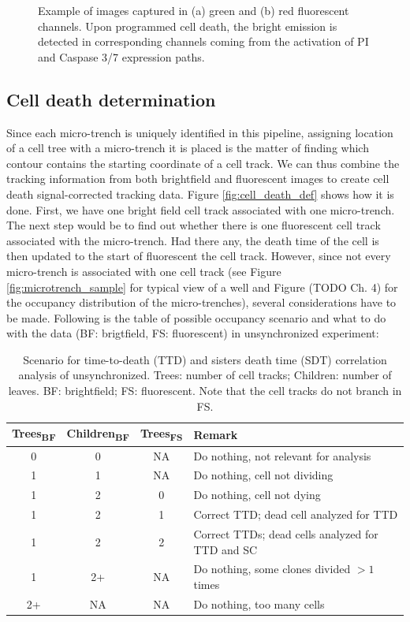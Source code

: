 \documentclass[pdftex,12pt,a4paper]{report}
\begin{document}
\begin{figure}[H]
\caption[Example of images from green and red fluorescent channels]{Example of images captured in (a) green and (b) red fluorescent channels. Upon programmed cell death, the bright emission is detected in corresponding channels coming from the activation of PI and Caspase 3/7 expression paths.}

\label{fig:onset_samples}
\end{figure}

\subsection{Cell death determination}
\label{subsection:cell_death_determination}

Since each micro-trench is uniquely identified in this pipeline, assigning location of a cell tree with a micro-trench it is placed is the matter of finding which contour contains the starting coordinate of a cell track. We can thus combine the tracking information from both brightfield and fluorescent images to create cell death signal-corrected tracking data. Figure \ref{fig:cell_death_def} shows how it is done. First, we have one bright field cell track associated with one micro-trench. The next step would be to find out whether there is one fluorescent cell track associated with the micro-trench. Had there any, the death time of the cell is then updated to the start of fluorescent the cell track. However, since not every micro-trench is associated with one cell track (see Figure \ref{fig:microtrench_sample} for typical view of a well and Figure (TODO  Ch. 4) for the occupancy distribution of the micro-trenches), several considerations have to be made. Following is the table of possible occupancy scenario and what to do with the data (BF: brigtfield, FS: fluorescent) in unsynchronized experiment:

\begin{table}[H]
\centering
\begin{tabular}{ c | c | c | l  }
Trees\textsubscript{BF} & Children\textsubscript{BF} & Trees\textsubscript{FS} & Remark \\
\hline
0 & 0 & NA & Do nothing, not relevant for analysis\\
1 & 1 & NA & Do nothing, cell not dividing \\
1 & 2 & 0  & Do nothing, cell not dying \\
1 & 2 & 1  & Correct TTD; dead cell analyzed for TTD \\
1 & 2 & 2  & Correct TTDs; dead cells analyzed for TTD and SC \\
1 & 2+ & NA & Do nothing, some clones divided $> 1$ times\\
2+ & NA & NA  & Do nothing, too many cells \\
\end{tabular}
\caption[Scenario for time-to-death (TTD) and sisters death time(SDT) correlation analysis of unsynchronized experiment]{Scenario for time-to-death (TTD) and sisters death time (SDT) correlation analysis  of unsynchronized. Trees: number of cell tracks; Children: number of leaves. BF: brightfield; FS: fluorescent. Note that the cell tracks do not branch in FS.}
\label{table:scenario_unsynchronized}
\end{table}
\end{document}
